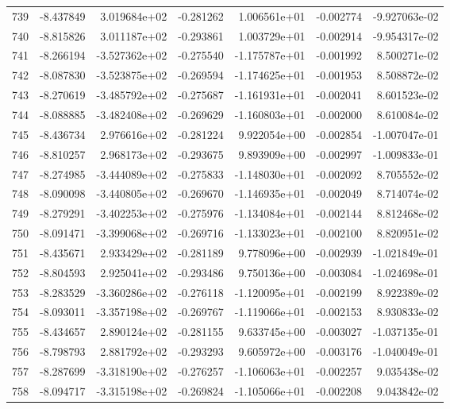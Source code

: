 \begin{tabular}{rrrrrrr}
 739 &  -8.437849 &  3.019684e+02 & -0.281262 &  1.006561e+01 &   -0.002774 & -9.927063e-02 \\
 740 &  -8.815826 &  3.011187e+02 & -0.293861 &  1.003729e+01 &   -0.002914 & -9.954317e-02 \\
 741 &  -8.266194 & -3.527362e+02 & -0.275540 & -1.175787e+01 &   -0.001992 &  8.500271e-02 \\
 742 &  -8.087830 & -3.523875e+02 & -0.269594 & -1.174625e+01 &   -0.001953 &  8.508872e-02 \\
 743 &  -8.270619 & -3.485792e+02 & -0.275687 & -1.161931e+01 &   -0.002041 &  8.601523e-02 \\
 744 &  -8.088885 & -3.482408e+02 & -0.269629 & -1.160803e+01 &   -0.002000 &  8.610084e-02 \\
 745 &  -8.436734 &  2.976616e+02 & -0.281224 &  9.922054e+00 &   -0.002854 & -1.007047e-01 \\
 746 &  -8.810257 &  2.968173e+02 & -0.293675 &  9.893909e+00 &   -0.002997 & -1.009833e-01 \\
 747 &  -8.274985 & -3.444089e+02 & -0.275833 & -1.148030e+01 &   -0.002092 &  8.705552e-02 \\
 748 &  -8.090098 & -3.440805e+02 & -0.269670 & -1.146935e+01 &   -0.002049 &  8.714074e-02 \\
 749 &  -8.279291 & -3.402253e+02 & -0.275976 & -1.134084e+01 &   -0.002144 &  8.812468e-02 \\
 750 &  -8.091471 & -3.399068e+02 & -0.269716 & -1.133023e+01 &   -0.002100 &  8.820951e-02 \\
 751 &  -8.435671 &  2.933429e+02 & -0.281189 &  9.778096e+00 &   -0.002939 & -1.021849e-01 \\
 752 &  -8.804593 &  2.925041e+02 & -0.293486 &  9.750136e+00 &   -0.003084 & -1.024698e-01 \\
 753 &  -8.283529 & -3.360286e+02 & -0.276118 & -1.120095e+01 &   -0.002199 &  8.922389e-02 \\
 754 &  -8.093011 & -3.357198e+02 & -0.269767 & -1.119066e+01 &   -0.002153 &  8.930833e-02 \\
 755 &  -8.434657 &  2.890124e+02 & -0.281155 &  9.633745e+00 &   -0.003027 & -1.037135e-01 \\
 756 &  -8.798793 &  2.881792e+02 & -0.293293 &  9.605972e+00 &   -0.003176 & -1.040049e-01 \\
 757 &  -8.287699 & -3.318190e+02 & -0.276257 & -1.106063e+01 &   -0.002257 &  9.035438e-02 \\
 758 &  -8.094717 & -3.315198e+02 & -0.269824 & -1.105066e+01 &   -0.002208 &  9.043842e-02 \\

\end{tabular}
